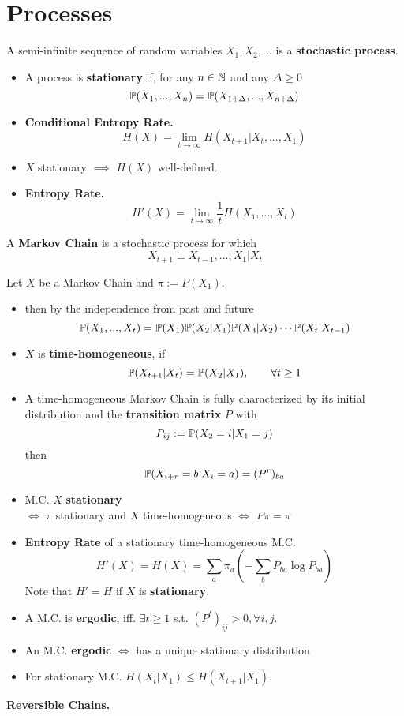 \section{Processes}

A semi-infinite sequence of random variables \(X_1, X_2, ... \) is a \textbf{stochastic process}.

\begin{itemize}[label=-]
    \item A process is \textbf{stationary} if, for any \(n \in \N\) and any \(\Delta \geq 0\) 
    \[\P(X_1, ..., X_n) = \P(X_{1+\Delta}, ..., X_{n+\Delta})\] 
    \item \textbf{Conditional Entropy Rate.} 
    \[H(X) = \lim_{t \to \infty} H(X_{t+1} | X_t, ..., X_1)\]
    \item \(X\) stationary \(\implies\) \(H(X)\) well-defined.
    \item \textbf{Entropy Rate.} \[H'(X) = \lim_{t \to \infty} \frac{1}{t}H(X_1, ..., X_t)\] 
\end{itemize}

A \textbf{Markov Chain} is a stochastic process for which 
\[X_{t+1} \perp X_{t-1}, ..., X_1 | X_t\]

Let \(X\) be a Markov Chain and \(\pi := P(X_1)\).
\begin{itemize}[label=-]
    \item then by the independence from past and future
    \[\P(X_1, ..., X_t) = \P(X_1)\P(X_2|X_1)\P(X_3|X_2)\cdots \P(X_t | X_{t-1})\]
    \item \(X\) is \textbf{time-homogeneous}, if \[\P(X_{t+1}|X_t) = \P(X_2|X_1), \qquad \forall t \geq 1\]
    \item A time-homogeneous Markov Chain is fully characterized by its initial distribution and the \textbf{transition matrix} \(P\) with 
    \[P_{ij} := \P(X_2 = i | X_1 = j)\] 
    then \[\P(X_{i+r} = b | X_i = a) = (P^r)_{ba}\]
    \item M.C. \(X\) \textbf{stationary} \\\(\iff\) \(\pi\) stationary and \(X\) time-homogeneous \(\iff\) \(P \pi = \pi\)
    \item\textbf{Entropy Rate} of a stationary time-homogeneous M.C. 
    \[H'(X) = H(X) = \sum_{a}\pi_a \left(- \sum_{b}P_{ba} \log P_{ba}\right)\]
    Note that \(H' = H\) if \(X\) is \textbf{stationary}.
    \item A M.C. is \textbf{ergodic}, iff. \(\exists t \geq 1\) s.t. \((P^t)_{ij} > 0, \forall i, j.\)
    \item An M.C. \textbf{ergodic} \(\iff\) has a unique stationary distribution
    \item For stationary M.C. \(H(X_t | X_1) \leq H(X_{t+1}|X_1)\).
\end{itemize}
\textbf{Reversible Chains.}

